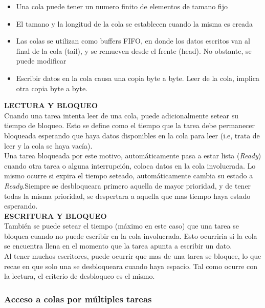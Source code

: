\documentclass{article}
\begin{document}
\begin{itemize}
\item Una cola puede tener un numero finito de elementos de tamano fijo
\item El tamano y la longitud de la cola se establecen cuando la misma es creada
\item Las colas se utilizan como buffers FIFO, en donde los datos escritos van al final de la cola (tail), y se remueven desde el frente (head). No obstante, se puede modificar
\item Escribir datos en la cola causa una copia byte a byte. Leer de la cola, implica otra copia byte a byte.
\end{itemize}


\textbf{LECTURA Y BLOQUEO}\\

Cuando una tarea intenta leer de una cola, puede adicionalmente setear su tiempo de bloqueo. Esto se define como el tiempo que la tarea debe permanecer bloqueada
esperando que haya datos disponibles en la cola para leer (i.e, trata de leer y la cola se haya vacía).\\

Una tarea bloqueada por este motivo, automáticamente pasa a estar lista (\textit{Ready}) cuando otra tarea o alguna interrupción, coloca datos en la cola involucrada. Lo mismo ocurre si expira el tiempo seteado, automáticamente cambia su estado a \textit{Ready}.Siempre se desbloqueara primero aquella de mayor prioridad, y de tener todas la misma prioridad, se despertara a aquella que mas tiempo haya estado esperando. \\


\textbf{ESCRITURA Y BLOQUEO}\\

También se puede setear el tiempo (máximo en este caso) que una tarea se bloquea cuando no puede escribir en la cola involucrada. Esto ocurriria si la cola se encuentra llena en el momento que la tarea apunta a escribir un dato. \\

Al tener muchos escritores, puede ocurrir que mas de una tarea se bloquee, lo que recae en que solo una se desbloqueara cuando haya espacio. Tal como ocurre con la lectura, el criterio de desbloqueo es el mismo. \\

\subsubsection{Acceso a colas por múltiples tareas}
\end{document}
